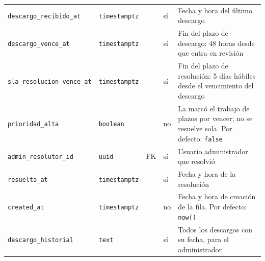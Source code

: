 {\begin{xltabular}{\textwidth}{@{}>{\raggedright\arraybackslash}p{3.6cm} >{\raggedright\arraybackslash}p{2.3cm} >{\raggedright\arraybackslash}p{1cm} >{\centering\arraybackslash}p{0.85cm} L@{}}
    \texttt{descargo\_\allowbreak{}recibido\_\allowbreak{}at} & \texttt{timestamptz} &  & sí & Fecha y hora del último descargo \\
    \texttt{descargo\_\allowbreak{}vence\_\allowbreak{}at} & \texttt{timestamptz} &  & sí & Fin del plazo de descargo: 48 horas desde que entra en revisión \\
    \texttt{sla\_\allowbreak{}resolucion\_\allowbreak{}vence\_\allowbreak{}at} & \texttt{timestamptz} &  & sí & Fin del plazo de resolución: 5 días hábiles desde el vencimiento del descargo \\
    \texttt{prioridad\_\allowbreak{}alta} & \texttt{boolean} &  & no & La marcó el trabajo de plazos por vencer; no se resuelve sola. Por defecto: \texttt{false} \\
    \texttt{admin\_\allowbreak{}resolutor\_\allowbreak{}id} & \texttt{uuid} & FK & sí & Usuario administrador que resolvió \\
    \texttt{resuelta\_\allowbreak{}at} & \texttt{timestamptz} &  & sí & Fecha y hora de la resolución \\
    \texttt{created\_\allowbreak{}at} & \texttt{timestamptz} &  & no & Fecha y hora de creación de la fila. Por defecto: \texttt{now(\allowbreak{})} \\
    \texttt{descargo\_\allowbreak{}historial} & \texttt{text} &  & sí & Todos los descargos con su fecha, para el administrador \\
\end{xltabular}
}

